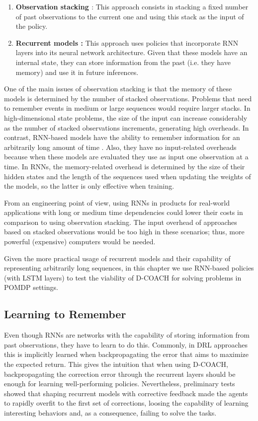 \begin{enumerate}
    \item \textbf{Observation stacking \cite{atari}}: This approach consists in stacking a fixed number of past observations to the current one and using this stack as the input of the policy. 
    \item \textbf{Recurrent models \cite{hausknecht2015deep}:} This approach uses policies that incorporate RNN layers into its neural network architecture. Given that these models have an internal state, they can store information from the past (i.e. they have memory) and use it in future inferences. 
\end{enumerate}

One of the main issues of observation stacking is that the memory of these models is determined by the number of stacked observations. Problems that need to remember events in medium or large sequences would require larger stacks. In high-dimensional state problems, the size of the input can increase considerably as the number of stacked observations increments, generating high overheads. In contrast, RNN-based models have the ability to remember information for an arbitrarily long amount of time \cite{lample2017playing}. Also, they have no input-related overheads because when these models are evaluated they use as input one observation at a time. In RNNs, the memory-related overhead is determined by the size of their hidden states and the length of the sequences used when updating the weights of the models, so the latter is only effective when training.

From an engineering point of view, using RNNs in products for real-world applications with long or medium time dependencies could lower their costs in comparison to using observation stacking. The input overhead of approaches based on stacked observations would be too high in these scenarios; thus, more powerful (expensive) computers would be needed. 

Given the more practical usage of recurrent models and their capability of representing arbitrarily long sequences, in this chapter we use RNN-based policies (with LSTM layers) to test the viability of D-COACH for solving problems in POMDP settings. 

\subsection{Learning to Remember}
Even though RNNs are networks with the capability of storing information from past observations, they have to learn to do this. Commonly, in DRL approaches this is implicitly learned when backpropagating the error that aims to maximize the expected return. This gives the intuition that when using D-COACH, backpropagating the correction error through the recurrent layers should be enough for learning well-performing policies. Nevertheless, preliminary tests showed that shaping recurrent models with corrective feedback made the agents to rapidly overfit to the first set of corrections, loosing the capability of learning interesting behaviors and, as a consequence, failing to solve the tasks. 

